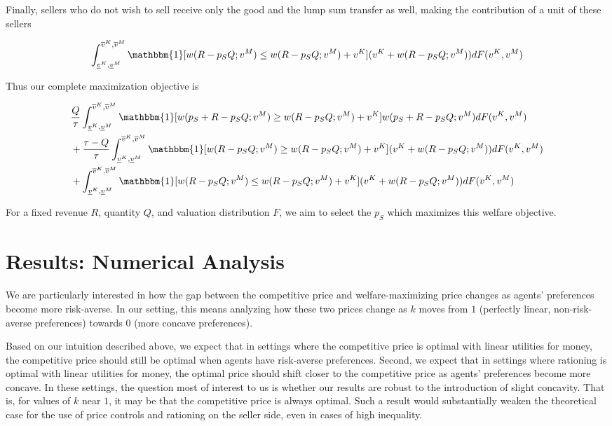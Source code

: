 \documentclass[AER]{AEA}
\begin{document}
Finally, sellers who do not wish to sell receive only the good and the lump sum transfer as well, making the contribution of a unit of these sellers

\begin{equation}
    \int_{\underline{v}^K, \underline{v}^M}^{\overline{v}^K, \overline{v}^M} \mathbbm{1}[w(R - p_SQ; v^M) \le w(R - p_S Q ; v^M) + v^K] (v^K + w(R - p_SQ; v^M)) dF(v^K, v^M)
\end{equation}

Thus our complete maximization objective is

\begin{equation}
    \begin{split}
        & \frac{Q}{\tau} \int_{\underline{v}^K, \underline{v}^M}^{\overline{v}^K, \overline{v}^M} \mathbbm{1}[w(p_S + R - p_SQ; v^M) \ge w(R - p_S Q ; v^M) + v^K] w(p_S + R - p_SQ; v^M) dF(v^K, v^M) \\
        & + \frac{\tau - Q}{\tau} \int_{\underline{v}^K, \underline{v}^M}^{\overline{v}^K, \overline{v}^M} \mathbbm{1}[w(R - p_SQ; v^M) \ge w(R - p_S Q ; v^M) + v^K] (v^K + w(R - p_SQ; v^M)) dF(v^K, v^M) \\
        & + \int_{\underline{v}^K, \underline{v}^M}^{\overline{v}^K, \overline{v}^M} \mathbbm{1}[w(R - p_SQ; v^M) \le w(R - p_S Q ; v^M) + v^K] (v^K + w(R - p_SQ; v^M)) dF(v^K, v^M)
    \end{split}
\end{equation}

For a fixed revenue $R$, quantity $Q$, and valuation distribution $F$, we aim to select the $p_S$ which maximizes this welfare objective.

\section{Results: Numerical Analysis}
\label{sec:results-numerical-analysis}

We are particularly interested in how the gap between the competitive price and welfare-maximizing price changes as agents' preferences become more risk-averse. In our setting, this means analyzing how these two prices change as $k$ moves from $1$ (perfectly linear, non-risk-averse preferences) towards $0$ (more concave preferences).

Based on our intuition described above, we expect that in settings where the competitive price is optimal with linear utilities for money, the competitive price should still be optimal when agents have risk-averse preferences. Second, we expect that in settings where rationing is optimal with linear utilities for money, the optimal price should shift closer to the competitive price as agents' preferences become more concave. In these settings, the question most of interest to us is whether our results are robust to the introduction of slight concavity. That is, for values of $k$ near $1$, it may be that the competitive price is always optimal. Such a result would substantially weaken the theoretical case for the use of price controls and rationing on the seller side, even in cases of high inequality.
\end{document}
